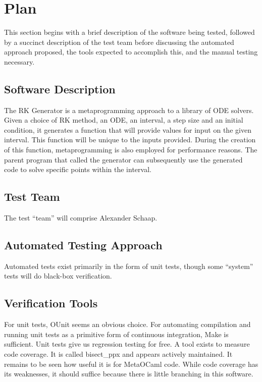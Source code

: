 \documentclass[12pt, titlepage]{article}
\begin{document}
\section{Plan}
This section begins with a brief description of the software being tested, 
followed by a succinct description of the test team before discussing the 
automated approach proposed, the tools expected to accomplish this, and the 
manual testing necessary.

\subsection{Software Description}

The RK Generator is a metaprogramming approach to a library of ODE solvers.
Given a choice of RK method, an ODE, an interval, a step size and an initial 
condition, it generates a function that will provide values for input on the 
given 
interval. This function will be unique to the inputs provided. During the 
creation of this function, metaprogramming is also employed for performance 
reasons.
The parent program that called the generator can subsequently use the generated 
code to solve specific points within the interval.

\subsection{Test Team}

The test ``team'' will comprise Alexander Schaap.
\subsection{Automated Testing Approach}

Automated tests exist primarily in the form of unit tests, though some 
``system'' tests will do black-box verification.

\subsection{Verification Tools}

For unit tests, OUnit seems an obvious choice. For automating compilation and 
running unit tests as a primitive form of continuous integration, Make is 
sufficient. Unit tests give us regression testing for free. A tool exists to 
measure code coverage. It is called bisect\_ppx and appears actively 
maintained. It remains to be seen how useful it is for MetaOCaml code. While 
code coverage has its weaknesses, it should suffice because there is little 
branching in this software.
\end{document}
